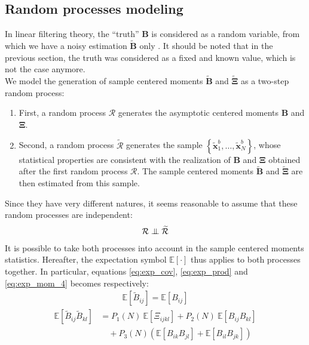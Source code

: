 \documentclass[12pt]{scrartcl}
\newcommand\independent{\protect\mathpalette{\protect\independenT}{\perp}}
\def\independenT#1#2{\mathrel{\setbox0\hbox{$#1#2$}%
\copy0\kern-\wd0\mkern4mu\box0}}
\begin{document}
\subsection{Random processes modeling}
In linear filtering theory, the ``truth'' $\mathbf{B}$ is considered as a random variable, from which we have a noisy estimation $\widetilde{\mathbf{B}}$ only \citep{wiener_1949}. It should be noted that in the previous section, the truth was considered as a fixed and known value, which is not the case anymore.\\
$  $\\
We model the generation of sample centered moments $\widetilde{\mathbf{B}}$ and $\widetilde{\boldsymbol{\Xi}}$ as a two-step random process:
\begin{enumerate}
\item First, a random process $\mathcal{R}$ generates the asymptotic centered moments $\mathbf{B}$ and $\boldsymbol{\Xi}$.
\item Second, a random process $\widetilde{\mathcal{R}}$ generates the sample $\left\{\widetilde{\mathbf{x}}^b_1,\dots,\widetilde{\mathbf{x}}^b_N\right\}$, whose statistical properties are consistent with the realization of $\mathbf{B}$ and $\boldsymbol{\Xi}$ obtained after the first random process $\mathcal{R}$. The sample centered moments $\widetilde{\mathbf{B}}$ and $\widetilde{\boldsymbol{\Xi}}$ are then estimated from this sample.
\end{enumerate}
Since they have very different natures, it seems reasonable to assume that these random processes are independent:
\begin{align}
\label{eq:inde_process}
\mathcal{R} \independent \widetilde{\mathcal{R}}
\end{align}
It is possible to take both processes into account in the sample centered moments statistics. Hereafter, the expectation symbol $\mathbb{E}\left[\cdot\right]$ thus applies to both processes together. In particular, equations \eqref{eq:exp_cov}, \eqref{eq:exp_prod} and \eqref{eq:exp_mom_4} becomes respectively:
\begin{align}
\label{eq:exp_cov_exp}
\mathbb{E} \left[\widetilde{B}_{ij}\right] = \mathbb{E} \left[B_{ij}\right]
\end{align}
\begin{align}
\label{eq:exp_prod_exp}
\mathbb{E} \left[\widetilde{B}_{ij} \widetilde{B}_{kl}\right] & = P_1(N) \ \mathbb{E} \left[\Xi_{ijkl}\right] + P_2(N) \ \mathbb{E} \left[B_{ij} B_{kl}\right] \nonumber \\
& \quad + P_3(N) \left(\mathbb{E} \left[B_{ik} B_{jl}\right] + \mathbb{E} \left[B_{il} B_{jk}\right]\right)
\end{align}
\end{document}
